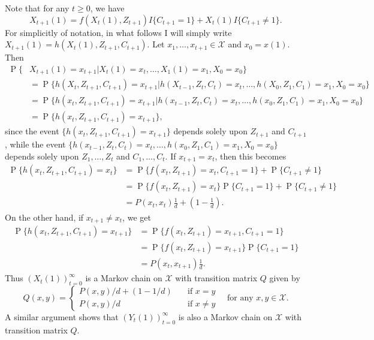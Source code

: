 \documentclass[12pt]{article}
\DeclareMathOperator{\Prob}{P}
\begin{document}
Note that for any $t \geq 0$, we have
\begin{equation*}
X_{t+1}(1) = f(X_t(1), Z_{t+1}) I\{C_{t+1} = 1\} + X_t(1) I\{C_{t+1} \neq 1\}.
\end{equation*}
For simplicitly of notation, in what follows I will simply write $X_{t+1}(1) = h(X_t(1), Z_{t+1}, C_{t+1})$. Let $x_1, \ldots, x_{t+1} \in \mathcal{X}$ and $x_0 = x(1)$. Then
\begin{align*}
\Prob\{&X_{t+1}(1) = x_{t+1} | X_t(1) = x_t, \ldots, X_1(1) = x_1, X_0 = x_0\} \\
&= \Prob\{h(X_t, Z_{t+1}, C_{t+1}) = x_{t+1} | h(X_{t-1}, Z_t, C_t) = x_t, \ldots, h(X_0, Z_1, C_1) = x_1, X_0 = x_0\} \\
&= \Prob\{h(x_t, Z_{t+1}, C_{t+1}) = x_{t+1} | h(x_{t-1}, Z_t, C_t) = x_t, \ldots, h(x_0, Z_1, C_1) = x_1, X_0 = x_0\} \\
&= \Prob\{h(x_t, Z_{t+1}, C_{t+1}) = x_{t+1}\},
\end{align*}
since the event $\{h(x_t, Z_{t+1}, C_{t+1}) = x_{t+1}\}$ depends solely upon $Z_{t+1}$ and $C_{t+1}$, while the event $\{h(x_{t-1}, Z_t, C_t) = x_t, \ldots, h(x_0, Z_1, C_1) = x_1, X_0 = x_0\}$ depends solely upon $Z_1, \ldots, Z_t$ and $C_1, \ldots, C_t$. If $x_{t+1} = x_t$, then this becomes
\begin{align*}
\Prob\{h(x_t, Z_{t+1}, C_{t+1}) = x_t\} &= \Prob\{f(x_t, Z_{t+1}) = x_t, C_{t+1} = 1\} + \Prob\{C_{t+1} \neq 1\} \\
&= \Prob\{f(x_t, Z_{t+1}) = x_t\} \Prob\{C_{t+1} = 1\} + \Prob\{C_{t+1} \neq 1\} \\
&= P(x_t, x_t) \frac{1}{d} + \left(1 - \frac{1}{d}\right).
\end{align*}
On the other hand, if $x_{t+1} \neq x_t$, we get
\begin{align*}
\Prob\{h(x_t, Z_{t+1}, C_{t+1}) = x_{t+1}\} &= \Prob\{f(x_t, Z_{t+1}) = x_{t+1}, C_{t+1} = 1\} \\
&= \Prob\{f(x_t, Z_{t+1}) = x_{t+1}\} \Prob\{C_{t+1} = 1\} \\
&= P(x_t, x_{t+1}) \frac{1}{d}.
\end{align*}
Thus $(X_t(1))_{t=0}^\infty$ is a Markov chain on $\mathcal{X}$ with transition matrix $Q$ given by
\begin{equation*}
Q(x, y) = \begin{cases}
P(x, y) / d + (1 - 1/d) &\quad \text{if $x = y$} \\
P(x, y) / d &\quad \text{if $x \neq y$}
\end{cases} \quad \text{for any $x, y \in \mathcal{X}$}.
\end{equation*}
A similar argument shows that $(Y_t(1))_{t=0}^\infty$ is also a Markov chain on $\mathcal{X}$ with transition matrix $Q$.
\end{document}

